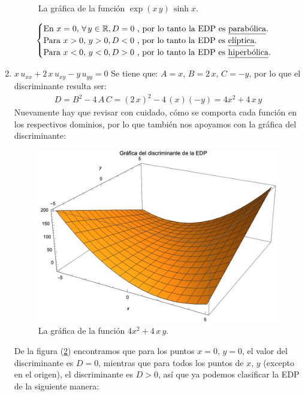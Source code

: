 \begin{enumerate}[label=\alph*)]
\begin{figure}[H]
    \caption{La gráfica de la función $\exp(x \, y) \, \sinh x$.}
    \label{fig:plot_03_exp_xy_sinhx}
\end{figure}
\begin{align*}
\begin{cases}
\mbox{En } x = 0, \, \forall \, y \in \mathbb{R}, D = 0 \mbox{ , por lo tanto la EDP es \underline{parabólica}}. \\
\mbox{Para } x > 0, \, y > 0, D < 0 \mbox{ , por lo tanto la EDP es \underline{elíptica}}. \\
\mbox{Para } x < 0, \, y < 0, D > 0 \mbox{ , por lo tanto la EDP es \underline{hiperbólica}}. \\
\end{cases}
\end{align*}
\item $x \, u_{xx} + 2 \, x \, u_{xy} - y \, u_{yy} = 0$ \label{eq:inciso_07}
Se tiene que: $A = x$, $B = 2 \, x$, $C = -y$, por lo que el discriminante resulta ser:
\begin{align*}
D = B^{2} - 4 \, A \, C = (2 \, x)^{2} - 4 \, (x) (-y) = 4 x^{2} + 4 \, x \, y
\end{align*}
Nuevamente hay que revisar con cuidado, cómo se comporta cada función en los respectivos dominios, por lo que también nos apoyamos con la gráfica del discriminante:
\begin{figure}[H]
    \centering
    \includegraphics[scale=0.85]{Imagenes/Ejercicio_Plot_04.eps}
    \caption{La gráfica de la función $4 x^{2} + 4 \, x \, y$.}
    \label{fig:plot_04_4x2+4xy}
\end{figure}
De la figura (\ref{fig:plot_04_4x2+4xy}) encontramos que para los puntos $x = 0$, $y = 0$, el valor del discriminante es $D = 0$, mientras que para todos los puntos de $x$, $y$ (excepto en el origen), el discriminante es $D > 0$, así que ya podemos clasificar la EDP de la siguiente manera:

\end{enumerate}
